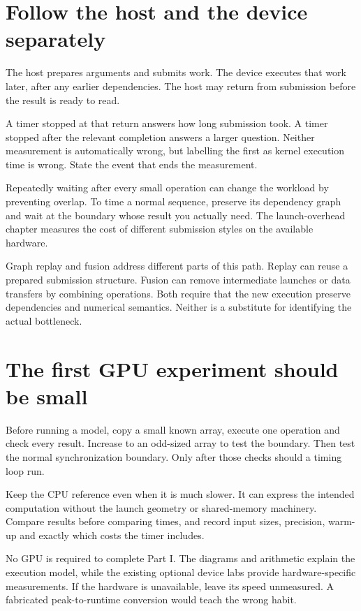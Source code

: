 \section{Follow the host and the device separately}
The host prepares arguments and submits work. The device executes that
work later, after any earlier dependencies. The host may return from
submission before the result is ready to read.

A timer stopped at that return answers how long submission took.
A timer stopped after the relevant completion answers a larger
question. Neither measurement is automatically wrong, but labelling
the first as kernel execution time is wrong. State the event that
ends the measurement.

Repeatedly waiting after every small operation can change the workload
by preventing overlap. To time a normal sequence, preserve its
dependency graph and wait at the boundary whose result you actually
need. The launch-overhead chapter measures the cost of different
submission styles on the available hardware.

Graph replay and fusion address different parts of this path.
Replay can reuse a prepared submission structure. Fusion can remove
intermediate launches or data transfers by combining operations.
Both require that the new execution preserve dependencies and
numerical semantics. Neither is a substitute for identifying the
actual bottleneck.

\section{The first GPU experiment should be small}
Before running a model, copy a small known array, execute one operation
and check every result. Increase to an odd-sized array to test the
boundary. Then test the normal synchronization boundary. Only after
those checks should a timing loop run.

Keep the CPU reference even when it is much slower. It can express
the intended computation without the launch geometry or shared-memory
machinery. Compare results before comparing times, and record input
sizes, precision, warm-up and exactly which costs the timer includes.

No GPU is required to complete Part I. The diagrams and arithmetic
explain the execution model, while the existing optional device labs
provide hardware-specific measurements. If the hardware is unavailable,
leave its speed unmeasured. A fabricated peak-to-runtime conversion
would teach the wrong habit.

